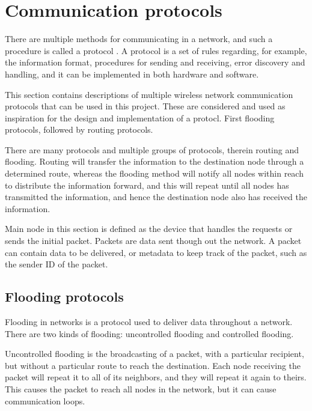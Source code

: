\section{Communication protocols} \label{cha:comprot}
There are multiple methods for communicating in a network, and such a procedure is called a protocol \cite{protocol}. A protocol is a set of rules regarding, for example, the information format, procedures for sending and receiving, error discovery and handling, and it can be implemented in both hardware and software.

This section contains descriptions of multiple wireless network communication protocols that can be used in this project. These are considered and used as inspiration for the design and implementation of a protocl. First flooding protocols, followed by routing protocols.

There are many protocols and multiple groups of protocols, therein routing and flooding. 
Routing will transfer the information to the destination node through a determined route, whereas the flooding method will notify all nodes within reach to distribute the information forward, and this will repeat until all nodes has transmitted the information, and hence the destination node also has received the information.


Main node in this section is defined as the device that handles the  requests or sends the initial packet.
Packets are data sent though out the network. A packet can contain data to be delivered, or metadata to keep track of the packet, such as the sender ID of the packet.


\subsection{Flooding protocols}\label{cha:floodingSec}
Flooding in networks is a protocol used to deliver data throughout a network.
There are two kinds of flooding: uncontrolled flooding and controlled flooding\cite{controlled_flooding}.

Uncontrolled flooding is the broadcasting of a packet, with a particular recipient, but without a particular route to reach the destination. Each node receiving the packet will repeat it to all of its neighbors, and they will repeat it again to theirs. This causes the packet to reach all nodes in the network, but it can cause communication loops\cite{flooding}.

